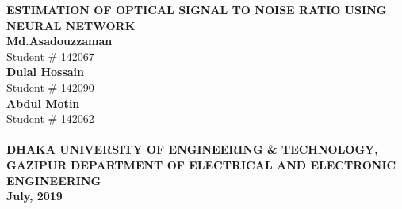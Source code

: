 \documentclass[12pt]{report}
\begin{document}
	\begin{titlepage}
		\begin{center}
			\LARGE {\bfseries {ESTIMATION OF OPTICAL SIGNAL TO NOISE RATIO USING NEURAL NETWORK}}\\
			\vspace{1.5cm}
			{\normalsize 
			\textbf{Md.Asadouzzaman}\\
			Student \# 142067\\
			\textbf{Dulal Hossain}\\
			Student \# 142090\\
			\textbf{Abdul Motin}\\
			Student \# 142062\\}
		\vspace{5cm}
			\\
			\vspace{4cm}
			{\fontsize{13}{0} \bfseries {DHAKA UNIVERSITY OF ENGINEERING \& TECHNOLOGY, GAZIPUR}}
			{\fontsize{12}{0} \bfseries {DEPARTMENT OF ELECTRICAL AND ELECTRONIC ENGINEERING}}\\
			{\fontsize{12}{0} \textbf{July, 2019}}
		\end{center}
	\end{titlepage}
\end{document}
